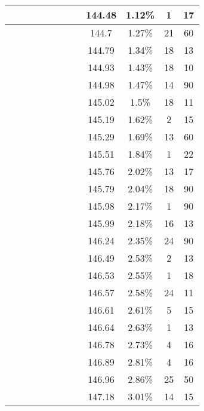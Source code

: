 \begin{center}
\begin{longtable}{|c|c|c|c|c|c|c|c|c|c|c|c|}
 \x &  \x &  &  \x &  \x &  \x &  &  \x & 144.48 & 1.12\% & 1 & 17 \\ \hline
 \x &  &  \x &  \x &  &  \x &  &  & 144.7 & 1.27\% & 21 & 60 \\ \hline
 \x &  \x &  \x &  \x &  &  \x &  &  & 144.79 & 1.34\% & 18 & 13 \\ \hline
 \x &  &  &  &  &  \x &  &  & 144.93 & 1.43\% & 18 & 10 \\ \hline
 \x &  &  \x &  \x &  \x &  \x &  \x &  & 144.98 & 1.47\% & 14 & 90 \\ \hline
 \x &  &  \x &  \x &  &  \x &  \x &  & 145.02 & 1.5\% & 18 & 11 \\ \hline
 \x &  \x &  \x &  \x &  &  \x &  \x &  \x & 145.19 & 1.62\% & 2 & 15 \\ \hline
 \x &  &  &  \x &  &  \x &  \x &  & 145.29 & 1.69\% & 13 & 60 \\ \hline
 \x &  \x &  &  &  &  &  &  \x & 145.51 & 1.84\% & 1 & 22 \\ \hline
 \x &  &  \x &  &  \x &  \x &  &  \x & 145.76 & 2.02\% & 13 & 17 \\ \hline
 \x &  \x &  \x &  &  \x &  &  &  \x & 145.79 & 2.04\% & 18 & 90 \\ \hline
 \x &  \x &  \x &  &  \x &  \x &  \x &  & 145.98 & 2.17\% & 1 & 90 \\ \hline
 \x &  &  \x &  &  &  &  &  & 145.99 & 2.18\% & 16 & 13 \\ \hline
 \x &  &  &  &  \x &  &  &  & 146.24 & 2.35\% & 24 & 90 \\ \hline
 \x &  \x &  \x &  &  \x &  \x &  &  & 146.49 & 2.53\% & 2 & 13 \\ \hline
 \x &  &  \x &  &  &  \x &  &  \x & 146.53 & 2.55\% & 1 & 18 \\ \hline
 \x &  \x &  \x &  &  &  &  &  & 146.57 & 2.58\% & 24 & 11 \\ \hline
 \x &  \x &  \x &  &  \x &  \x &  \x &  \x & 146.61 & 2.61\% & 5 & 15 \\ \hline
 \x &  \x &  &  \x &  \x &  \x &  \x &  & 146.64 & 2.63\% & 1 & 13 \\ \hline
 \x &  \x &  \x &  \x &  \x &  \x &  \x &  \x & 146.78 & 2.73\% & 4 & 16 \\ \hline
 \x &  \x &  \x &  \x &  \x &  \x &  \x &  & 146.89 & 2.81\% & 4 & 16 \\ \hline
 \x &  \x &  &  &  &  &  &  & 146.96 & 2.86\% & 25 & 50 \\ \hline
 \x &  \x &  \x &  &  &  \x &  &  & 147.18 & 3.01\% & 14 & 15 \\ \hline

\end{longtable}
\end{center}
